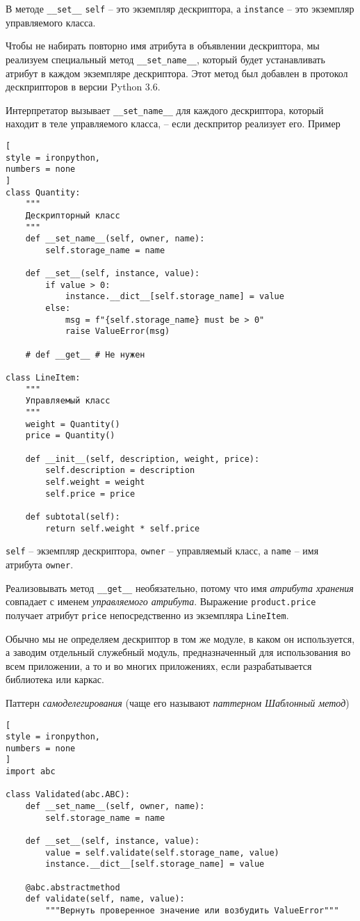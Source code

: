 \documentclass[%
	11pt,
	a4paper,
	utf8,
		]{article}
\begin{document}
В методе \verb*|__set__| \verb|self| -- это экземпляр дескриптора, а \verb*|instance| -- это экземпляр управляемого класса.

Чтобы не набирать повторно имя атрибута в объявлении дескриптора, мы реализуем специальный метод \verb|__set_name__|, который будет устанавливать атрибут в каждом экземпляре дескриптора. Этот метод был добавлен в протокол дескприпторов в версии Python 3.6.

Интерпретатор вызывает \verb*|__set_name__| для каждого дескриптора, который находит в теле управляемого класса, -- если дескпритор реализует его. Пример
\begin{lstlisting}[
style = ironpython,
numbers = none
]
class Quantity:
    """
    Дескрипторный класс
    """
    def __set_name__(self, owner, name):
        self.storage_name = name
    
    def __set__(self, instance, value):
        if value > 0:
            instance.__dict__[self.storage_name] = value
        else:
            msg = f"{self.storage_name} must be > 0"
            raise ValueError(msg)
            
    # def __get__ # Не нужен
    
class LineItem:
    """
    Управляемый класс
    """
    weight = Quantity()
    price = Quantity()
    
    def __init__(self, description, weight, price):
        self.description = description
        self.weight = weight
        self.price = price
        
    def subtotal(self):
        return self.weight * self.price
\end{lstlisting}

\verb|self| -- экземпляр дескриптора, \verb*|owner| -- управляемый класс, а \verb|name| -- имя атрибута \verb*|owner|. 

Реализовывать метод \verb|__get__| необязательно, потому что имя \emph{атрибута хранения} совпадает с именем \emph{управляемого атрибута}. Выражение \verb*|product.price| получает атрибут \verb|price| непосредственно из экземпляра \verb*|LineItem|.

Обычно мы не определяем дескриптор в том же модуле, в каком он используется, а заводим отдельный служебный модуль, предназначенный для использования во всем приложении, а то и во многих приложениях, если разрабатывается библиотека или каркас.

Паттерн \emph{самоделегирования} (чаще его называют \emph{паттерном Шаблонный метод})
\begin{lstlisting}[
style = ironpython,
numbers = none
]
import abc

class Validated(abc.ABC):
    def __set_name__(self, owner, name):
        self.storage_name = name
        
    def __set__(self, instance, value):
        value = self.validate(self.storage_name, value)
        instance.__dict__[self.storage_name] = value
        
    @abc.abstractmethod
    def validate(self, name, value):
        """Вернуть проверенное значение или возбудить ValueError"""
\end{lstlisting}
\end{document}
